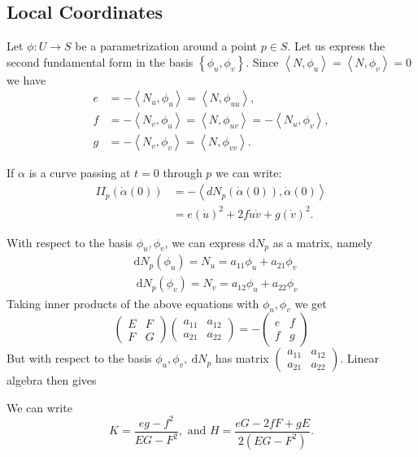 \documentclass[10pt]{article}
\begin{document}
\subsection{Local Coordinates}

Let $\phi: U \rightarrow S$ be a parametrization around a point $p \in S$. Let us express the second fundamental form in the basis $\left\{\phi_u, \phi_v\right\}$. Since $\left\langle N, \phi_u\right\rangle=\left\langle N, \phi_v\right\rangle=0$ we have
\begin{align*}
 e&=-\left\langle N_u, \phi_u\right\rangle=\left\langle N, \phi_{u u}\right\rangle, \\
 f&=-\left\langle N_v, \phi_u\right\rangle=\left\langle N, \phi_{u v}\right\rangle=-\left\langle N_u, \phi_v\right\rangle, \\
 g&=-\left\langle N_v, \phi_v\right\rangle=\left\langle N, \phi_{v v}\right\rangle .
\end{align*}

If $\alpha$ is a curve passing at $t=0$ through $p$ we can write:
\begin{align*}
    I I_p(\dot{\alpha}(0)) &=-\left\langle d N_p(\dot{\alpha}(0)), \dot{\alpha}(0)\right\rangle\\
    &=e(\dot{u})^2+2 f \dot{u} \dot{v}+g(\dot{v})^2 .
\end{align*}

With respect to the basis $\phi_u, \phi_v$, we can express $\mathrm{d} N_p$ as a matrix, namely
$$
\begin{aligned}
& \mathrm{d} N_p\left(\phi_u\right)=N_u=a_{11} \phi_u+a_{21} \phi_v \\
& \mathrm{~d} N_p\left(\phi_v\right)=N_v=a_{12} \phi_u+a_{22} \phi_v
\end{aligned}
$$
Taking inner products of the above equations with $\phi_u, \phi_v$ we get
$$
\begin{pmatrix}
E & F \\
F & G
\end{pmatrix}\begin{pmatrix}
a_{11} & a_{12} \\
a_{21} & a_{22}
\end{pmatrix}=-\begin{pmatrix}
e & f \\
f & g
\end{pmatrix}
$$
But with respect to the basis $\phi_u, \phi_v, \mathrm{~d} N_p$ has matrix $\begin{pmatrix}a_{11} & a_{12} \\ a_{21} & a_{22}\end{pmatrix}$. Linear algebra then gives
\begin{corollary}
    We can write
    $$
    K=\frac{e g-f^2}{E G-F^2}, \text { and } H=\frac{e G-2 f F+g E}{2\left(E G-F^2\right)}.
    $$
\end{corollary}
\end{document}
